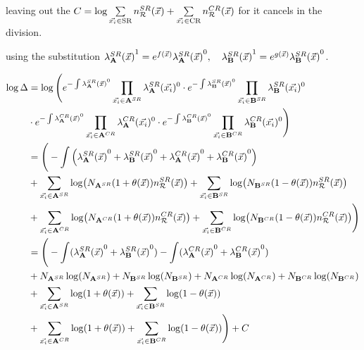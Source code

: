 \documentclass[../../ddppaper2.tex]{subfiles}
\begin{document}
\noindent leaving out the $C = \log \sum\limits_{{\vec{{x}_i}} \in \text{SR}}n_{\mathcal{R}}^{SR}({\vec{{x}}}) + \sum\limits_{{\vec{{x}_i}} \in \text{CR}} n_{\mathcal{R}}^{CR}({\vec{{x}}})$ for it cancels in the division.

\noindent using the substitution ${{\lambda}_{{\mathbf{A}}}^{SR}(\vec{{x}})}^1 = e^{f(\vec{{x}})}{{\lambda}_{{\mathbf{A}}}^{SR}(\vec{{x}})}^0, \quad {{\lambda}_{{\mathbf{B}}}^{SR}(\vec{{x}})}^1 = e^{g(\vec{{x}})}{{\lambda}_{{\mathbf{B}}}^{SR}(\vec{{x}})}^0$.

\begin{equation}
\label{eq:overall_test_statistic_denominator}
\begin{aligned}
\log \Delta &= \log \Bigg(
    e^{- \int \srdist{\dataset{A}}^0} \prod\limits_{\event \in \srdataset{A}} \srdistevent{\dataset{A}}^0
    \cdot
    e^{- \int \srdist{\dataset{B}}^0} \prod\limits_{\event \in \srdataset{B}} \srdistevent{\dataset{B}}^0 \\&
    \cdot
    e^{- \int \crdist{\dataset{A}}^0} \prod\limits_{\event \in \crdataset{A}} \crdistevent{\dataset{A}}^0
    \cdot
    e^{- \int \crdist{\dataset{B}}^0} \prod\limits_{\event \in \crdataset{B}} \crdistevent{\dataset{B}}^0
\Bigg)
\\&
= \Bigg(
    - \int \left(
        \srdist{\dataset{A}}^0
        + \srdist{\dataset{B}}^0
        + \crdist{\dataset{A}}^0
        + \crdist{\dataset{B}}^0
    \right)
    \\&
    + \sum\limits_{\event \in \srdataset{A}} \log({N_\srdataset{A}} (1 + {\nparam(\anyevent)}) \srrefdist)
    + \sum\limits_{\event \in \srdataset{B}} \log({N_\srdataset{B}} (1 - {\nparam(\anyevent)}) \srrefdist) \\&
    + \sum\limits_{\event \in \crdataset{A}} \log({N_\crdataset{A}} (1 + {\nparam(\anyevent)}) \crrefdist)
    + \sum\limits_{\event \in \crdataset{B}} \log({N_\crdataset{B}} (1 - {\nparam(\anyevent)}) \crrefdist)
\Bigg)
\\&
= \Bigg(
    - \int (\srdist{\dataset{A}}^0 + \srdist{\dataset{B}}^0)
    - \int (\crdist{\dataset{A}}^0 + \crdist{\dataset{B}}^0)
    \\&
    + N_{\srdataset{A}}\log({N_\srdataset{A}})
    + N_{\srdataset{B}}\log({N_\srdataset{B}})
    + N_{\crdataset{A}}\log({N_\crdataset{A}})
    + N_{\crdataset{B}}\log({N_\crdataset{B}})
    \\&
    + \sum\limits_{\event \in \srdataset{A}} \log(1 + {\nparam(\anyevent)})
    + \sum\limits_{\event \in \srdataset{B}} \log(1 - {\nparam(\anyevent)}) \\&
    + \sum\limits_{\event \in \crdataset{A}} \log(1 + {\nparam(\anyevent)})
    + \sum\limits_{\event \in \crdataset{B}} \log(1 - {\nparam(\anyevent)})
\Bigg) + C
\end{aligned}
\end{equation}
\end{document}
